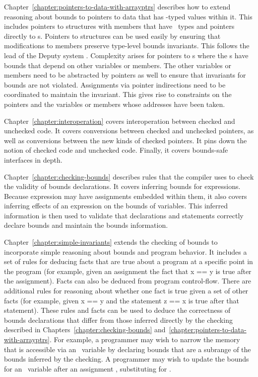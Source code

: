 Chapter~\ref{chapter:pointers-to-data-with-arrayptrs} describes how
to extend reasoning about bounds to pointers to data that has \arrayptr-typed
values within it.  This includes pointers to structures with members that
have \arrayptr\ types and pointers directly to \arrayptr s.  Pointers to
structures can be used easily by ensuring that modifications to members
preserve type-level bounds invariants.
This follows the lead of the Deputy system \cite{Condit2007}.
Complexity arises for pointers to \arrayptr s where
the \arrayptr s have bounds that depend on other variables or members.  The
other variables or members need to be abstracted by pointers as well to ensure
that invariants for bounds are not violated.  Assignments via pointer
indirections need to be coordinated to maintain the invariant.  This
gives rise to constraints on the pointers and the variables or
members whose addresses have been taken.

Chapter~\ref{chapter:interoperation} covers interoperation between
checked and unchecked code. It covers conversions between checked and
unchecked pointers, as well as conversions between the new kinds of checked pointers.
It pins down the notion of checked code  and unchecked code. Finally, it covers
bounds-safe interfaces in depth.

Chapter~\ref{chapter:checking-bounds} describes rules that the compiler uses to check the validity
of bounds declarations. It covers inferring bounds for expressions.
Because expression may have assignments embedded within them, it also
covers inferring effects of an expression on the bounds of variables.
This inferred information is then used to validate that declarations and
statements correctly declare bounds and maintain the bounds information.

Chapter~\ref{chapter:simple-invariants}
extends the checking of bounds to incorporate simple
reasoning about bounds and program behavior. It includes a set of rules
for deducing facts that are true about a program at a specific point in
the program (for example, given an assignment  the fact
that x == y is true after the assignment). Facts can also be deduced
from program control-flow. There are additional rules for reasoning
about whether one fact is true given a set of other facts (for example,
given x == y and the statement  z == x is true after that
statement). These rules and facts can be used to deduce the correctness
of bounds declarations that differ from those inferred directly by the
checking described in Chapters~\ref{chapter:checking-bounds}
and~\ref{chapter:pointers-to-data-with-arrayptrs}. For example,
a programmer may wish to narrow the memory that is accessible via an
\arrayptr\ variable by declaring bounds that are a subrange of
the bounds inferred by the checking. A programmer may wish to update the
bounds for an \arrayptr\ variable after an assignment , substituting
 for .

